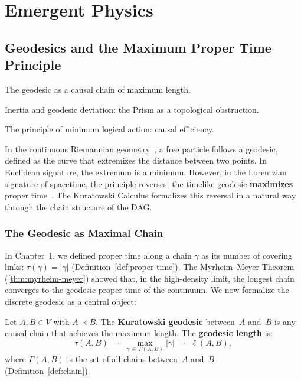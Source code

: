 \part{Emergent Physics}

\chapter{Geodesics and the Maximum Proper Time Principle}

\begin{introduction}
  \item The geodesic as a causal chain of maximum length.
  \item Inertia and geodesic deviation: the Prism as a topological
        obstruction.
  \item The principle of minimum logical action: causal efficiency.
\end{introduction}

In the continuous Riemannian geometry~\cite{wald1984}, a free
particle follows a geodesic, defined as the curve that extremizes the
distance between two points. In Euclidean signature, the extremum is a
minimum. However, in the Lorentzian signature of spacetime, the
principle reverses: the timelike geodesic \textbf{maximizes} proper
time~\cite{mtw1973}. The Kuratowski Calculus formalizes this reversal
in a natural way through the chain structure of the DAG.

\section{The Geodesic as Maximal Chain}

In Chapter~1, we defined proper time along a chain $\gamma$ as its
number of covering links:
$\tau(\gamma) = |\gamma|$
(Definition~\ref{def:proper-time}). The Myrheim--Meyer Theorem
(\ref{thm:myrheim-meyer}) showed that, in the high-density limit, the
longest chain converges to the geodesic proper time of the continuum.
We now formalize the discrete geodesic as a central object:

\begin{definition}
\label{def:geodesic}
Let $A, B \in V$ with $A \prec B$. The \textbf{Kuratowski geodesic}
between~$A$ and~$B$ is any causal chain that achieves the maximum
length. The \textbf{geodesic length} is:
\begin{equation}
  \boxed{\;
  \tau(A, B)
  \;=\;
  \max_{\gamma \,\in\, \Gamma(A,B)} |\gamma|
  \;=\; \ell(A,B),
  \;}
  \label{eq:geodesic-length}
\end{equation}
where $\Gamma(A,B)$ is the set of all chains between~$A$ and~$B$
(Definition~\ref{def:chain}).
\end{definition}

